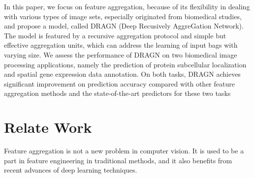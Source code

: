 \documentclass[10pt,twocolumn,letterpaper]{article}
\begin{document}
In this paper, we focus on feature aggregation, because of its flexibility in dealing with various types of image sets, especially originated from biomedical studies, and propose a model, called DRAGN (Deep Recusively AggreGation Network). The model is featured by 
a recursive aggregation protocol and simple but effective aggregation units, which can address the learning of input bags with varying size. We assess the performance of DRAGN on two biomedical image processing applications, namely the prediction of protein subcellular localization and spatial gene expression data annotation. On both tasks, DRAGN achieves significant improvement on prediction accuracy compared with other feature aggregation methods and the state-of-the-art predictors for these two tasks 
% 
% 
% 
%
%

\section{Relate Work}
Feature aggregation is not a new problem in computer vision. It is used to be a part in feature engineering in traditional methods, and it also benefits from recent advances of deep learning techniques.
\end{document}
